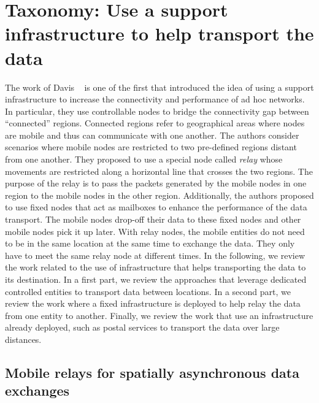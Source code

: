 \section{Taxonomy: Use a support infrastructure to help transport the data}
\label{sec:indirect-delivery}

The work of Davis \etal~\cite{davis2001wearable} is one of the first that introduced the idea of using a support infrastructure to increase the connectivity and performance of ad hoc networks. In particular, they use controllable nodes to bridge the connectivity gap between ``connected'' regions. Connected regions refer to geographical areas where nodes are mobile and thus can communicate with one another. The authors consider scenarios where mobile nodes are restricted to two pre-defined regions distant from one another. They proposed to use a special node called \textit{relay} whose movements are restricted along a horizontal line that crosses the two regions. The purpose of the relay is to pass the packets generated by the mobile nodes in one region to the mobile nodes in the other region. Additionally, the authors proposed to use fixed nodes that act as mailboxes to enhance the performance of the data transport. The mobile nodes drop-off their data to these fixed nodes and other mobile nodes pick it up later. With relay nodes, the mobile entities do not need to be in the same location at the same time to exchange the data. They only have to meet the same relay node at different times. In the following, we review the work related to the use of infrastructure that helps transporting the data to its destination. In a first part, we review the approaches that leverage dedicated controlled entities to transport data between locations. In a second part, we review the work where a fixed infrastructure is deployed to help relay the data from one entity to another. Finally, we review the work that use an infrastructure already deployed, such as postal services to transport the data over large distances.


\subsection{Mobile relays for spatially asynchronous data exchanges}

